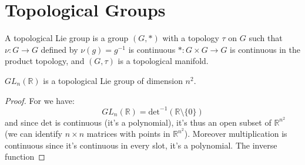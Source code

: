 \documentclass{article}                                                        %
\begin{document}
    \section{Topological Groups}
        \begin{definition}
            A topological Lie group is a group $(G,*)$ with a topology $\tau$ on
            $G$ such that $\nu:G\rightarrow{G}$ defined by
            $\nu(g)=g^{\minus{1}}$ is continuous $*:G\times{G}\rightarrow{G}$ is
            continuous in the product topology, and $(G,\tau)$ is a topological
            manifold.
        \end{definition}
        \begin{theorem}
            $GL_{n}(\mathbb{R})$ is a topological Lie group of dimension
            $n^{2}$.
        \end{theorem}
        \begin{proof}
            For we have:
            \begin{equation}
                GL_{n}(\mathbb{R})=
                \textrm{det}^{\minus{1}}(\mathbb{R}\setminus\{0\})
            \end{equation}
            and since $\textrm{det}$ is continuous (it's a polynomial), it's
            thus an open subset of $\mathbb{R}^{n^{2}}$ (we can identify
            $n\times{n}$ matrices with points in $\mathbb{R}^{n^{2}}$). Moreover
            multiplication is continuous since it's continuous in every slot,
            it's a polynomial. The inverse function
        \end{proof}
\end{document}
